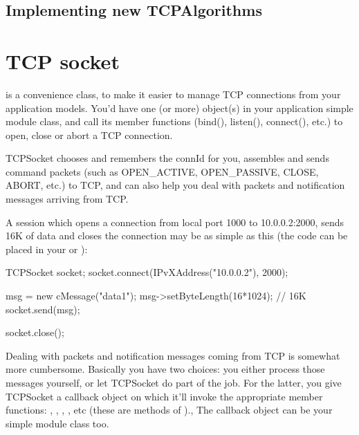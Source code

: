 \subsection{Implementing new TCPAlgorithms}

\section{TCP socket}


 is a convenience class, to make it easier to manage TCP connections
from your application models. You'd have one (or more)  object(s)
in your application simple module class, and call its member functions
(bind(), listen(), connect(), etc.) to open, close or abort a TCP connection.

TCPSocket chooses and remembers the connId for you, assembles and sends command
packets (such as OPEN\_ACTIVE, OPEN\_PASSIVE, CLOSE, ABORT, etc.) to TCP,
and can also help you deal with packets and notification messages arriving
from TCP.

A session which opens a connection from local port 1000 to 10.0.0.2:2000,
sends 16K of data and closes the connection may be as simple as this
(the code can be placed in your  or
):

\begin{cpp}
TCPSocket socket;
socket.connect(IPvXAddress("10.0.0.2"), 2000);

msg = new cMessage("data1");
msg->setByteLength(16*1024);  // 16K
socket.send(msg);

socket.close();
\end{cpp}


Dealing with packets and notification messages coming from TCP is somewhat
more cumbersome. Basically you have two choices: you either process those
messages yourself, or let TCPSocket do part of the job. For the latter,
you give TCPSocket a callback object on which it'll invoke the appropriate
member functions: , ,
, ,
etc (these are methods of ).,
The callback object can be your simple module class too.

